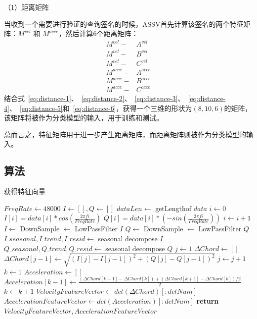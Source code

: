 （1）距离矩阵

当收到一个需要进行验证的查询签名的时候，ASSV首先计算该签名的两个特征矩阵：$M^{vel}$ 和 $M^{acce}$，然后计算6个距离矩阵：
\begin{align}
M^{vel} -& A^{vel}  \label{eq:distance-1} \\
M^{vel} -& B^{vel}  \label{eq:distance-2} \\
M^{vel} -& C^{vel}  \label{eq:distance-3} \\
M^{acce} -& A^{acce} \label{eq:distance-4} \\
M^{acce} -& B^{acce} \label{eq:distance-5} \\
M^{acce} -& C^{acce} \label{eq:distance-6}
\end{align}
结合式~\ref{eq:distance-1}、~\ref{eq:distance-2}、~\ref{eq:distance-3}、~\ref{eq:distance-4}、~\ref{eq:distance-5}和~\ref{eq:distance-6}，获得一个三维的形状为$(8,10,6)$的矩阵，该矩阵将被作为分类模型的输入，用于训练和测试。

总而言之，特征矩阵用于进一步产生距离矩阵，而距离矩阵则被作为分类模型的输入。

\subsection{算法}

\begin{algorithm}
\caption{获得特征向量}
\label{alg:get-feature-vector}
\begin{algorithmic}[1]
\State $FreqRate \gets 48000$           
\State $I \gets [], Q \gets []$  
\State $dataLen \gets$ getLengthof $data$  
\State $i \gets 0$
 
\State $I[i]=data[i]*cos(\frac{2\pi fi}{FreqRate})$
\State $Q[i]=data[i]*(-sin(\frac{2\pi fi}{FreqRate}))$
\State $i \gets i + 1$
\EndWhile\label{euclidendwhile}
\State $I \gets $ DownSample $\gets $ LowPassFilter $I$   
\State $Q \gets $ DownSample $\gets $ LowPassFilter $Q$   
\State $I\_seasonal,I\_trend,I\_resid \gets$ seasonal decompose $I$      
\State $Q\_seasonal,Q\_trend,Q\_resid \gets$ seasonal decompose $Q$  
\State $j \gets 1$
\State $\Delta Chord \gets []$
 
\State $\Delta Chord[j-1] \gets \sqrt{(I[j]-I[j-1])^{2} + (Q[j]-Q[j-1])^{2}}$
\State $j \gets j + 1$
\EndWhile\label{euclidendwhile}
\State $k \gets 1$
\State $Acceleration \gets []$
 
\State $Acceleration[k-1] \gets \frac{(\Delta Chord[k+1] - \Delta Chord[k]) + (\Delta Chord[k+1] - \Delta Chord[k])/2}{2}$
\State $k \gets k + 1$
\EndWhile\label{euclidendwhile}
\State $VelocityFeatureVector \gets dct(\Delta Chord)[:dctNum]$
\State $AccelerationFeatureVector \gets dct(Acceleration)[:dctNum]$
\State \textbf{return} $VelocityFeatureVector,AccelerationFeatureVector$
\EndProcedure
\end{algorithmic}
\end{algorithm}

